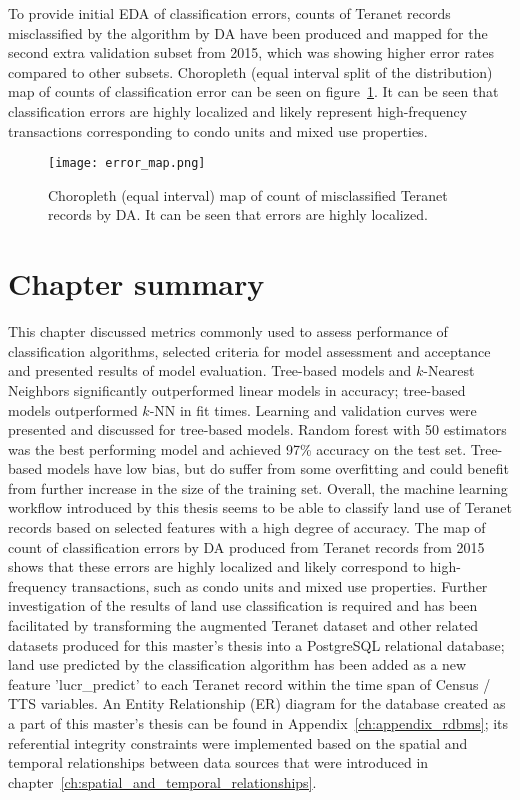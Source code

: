 To provide initial EDA of classification errors, counts of Teranet records misclassified by the algorithm by DA have been produced and mapped for the second extra validation subset from 2015, which was showing higher error rates compared to other subsets.
Choropleth (equal interval split of the distribution) map of counts of classification error can be seen on figure~\ref{fig:error_map}.
It can be seen that classification errors are highly localized and likely represent high-frequency transactions corresponding to condo units and mixed use properties.

\begin{figure}[hbt!]
    \centering
    \texttt{[image: error\_map.png]}
    \caption{Choropleth (equal interval) map of count of misclassified Teranet records by DA.
    It can be seen that errors are highly localized.}
    \label{fig:error_map}
\end{figure}

\section{Chapter summary} \label{sec:evaluation_summary}

This chapter discussed metrics commonly used to assess performance of classification algorithms, selected criteria for model assessment and acceptance and presented results of model evaluation.
Tree-based models and $k$-Nearest Neighbors significantly outperformed linear models in accuracy;
tree-based models outperformed $k$-NN in fit times.
Learning and validation curves were presented and discussed for tree-based models.
Random forest with 50 estimators was the best performing model and achieved 97\% accuracy on the test set.
Tree-based models have low bias, but do suffer from some overfitting and could benefit from further increase in the size of the training set.
Overall, the machine learning workflow introduced by this thesis seems to be able to classify land use of Teranet records based on selected features with a high degree of accuracy.
The map of count of classification errors by DA produced from Teranet records from 2015 shows that these errors are highly localized and likely correspond to high-frequency transactions, such as condo units and mixed use properties.
Further investigation of the results of land use classification is required and has been facilitated by transforming the augmented Teranet dataset and other related datasets produced for this master's thesis into a PostgreSQL relational database;
land use predicted by the classification algorithm has been added as a new feature 'lucr\_predict' to each Teranet record within the time span of Census / TTS variables.
An Entity Relationship (ER) diagram for the database created as a part of this master's thesis can be found in Appendix~\ref{ch:appendix_rdbms};
its referential integrity constraints were implemented based on the spatial and temporal relationships between data sources that were introduced in chapter~\ref{ch:spatial_and_temporal_relationships}.